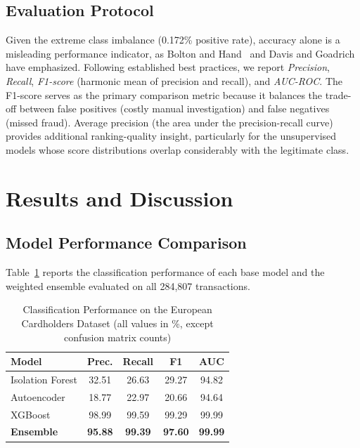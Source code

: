 \documentclass[conference,10pt]{IEEEtran}
\begin{document}
\subsection{Evaluation Protocol}
Given the extreme class imbalance (0.172\% positive rate), accuracy alone is a misleading performance indicator, as Bolton and Hand~\cite{bolton2002statistical} and Davis and Goadrich~\cite{davis2006relationship} have emphasized. Following established best practices, we report \textit{Precision}, \textit{Recall}, \textit{F1-score} (harmonic mean of precision and recall), and \textit{AUC-ROC}. The F1-score serves as the primary comparison metric because it balances the trade-off between false positives (costly manual investigation) and false negatives (missed fraud). Average precision (the area under the precision-recall curve) provides additional ranking-quality insight, particularly for the unsupervised models whose score distributions overlap considerably with the legitimate class.

\section{Results and Discussion}

\subsection{Model Performance Comparison}

Table~\ref{tab:results} reports the classification performance of each base model and the weighted ensemble evaluated on all 284,807 transactions.

\begin{table}[t]
\centering
\caption{Classification Performance on the European Cardholders Dataset (all values in \%, except confusion matrix counts)}
\label{tab:results}
\begin{tabular}{@{}lcccc@{}}
\toprule
\textbf{Model} & \textbf{Prec.} & \textbf{Recall} & \textbf{F1} & \textbf{AUC} \\
\midrule
Isolation Forest & 32.51 & 26.63 & 29.27 & 94.82 \\
Autoencoder      & 18.77 & 22.97 & 20.66 & 94.64 \\
XGBoost          & 98.99 & 99.59 & 99.29 & 99.99 \\
\midrule
\textbf{Ensemble} & \textbf{95.88} & \textbf{99.39} & \textbf{97.60} & \textbf{99.99} \\
\bottomrule
\end{tabular}
\end{table}
\end{document}

